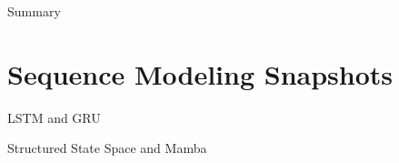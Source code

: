



\begin{slide}[\slideopts,toc={Hypersphere}]{Summary}
\vspace{-1em}
\end{slide}

\section[\sectopts,toc={History Samples}]{Sequence Modeling Snapshots}

\begin{slidewhite}[\slideopts, toc={LSTM \& GRU}]{LSTM and GRU}
\vspace{-6em}
\end{slidewhite}

\begin{slidewhite}[\slideopts, toc={SSM \& Mamba}]{Structured State Space and Mamba}
\vspace{-6em}
\end{slidewhite}

